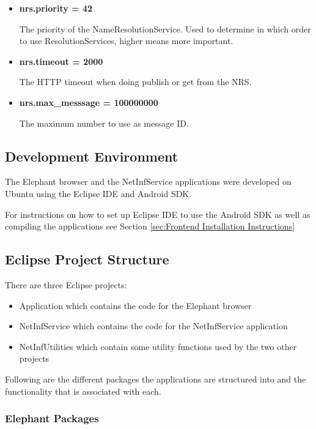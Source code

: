 \begin{itemize}
	\item{\bf nrs.priority = 42}	
	
	The priority of the NameResolutionService. Used to determine in which order to use ResolutionServices, higher means more important.	
	
	\item{\bf nrs.timeout = 2000}
	
	The HTTP timeout when doing publish or get from the NRS.
	
	\item{\bf nrs.max\_messsage = 100000000}
	
	The maximum number to use as message ID.
	
\end{itemize}

\subsection{Development Environment}

The Elephant browser and the NetInfService applications were developed on Ubuntu using the Eclipse IDE and Android SDK.

For instructions on how to set up Eclipse IDE to use the Android SDK as well as compiling the applications see Section \ref{sec:Frontend Installation Instructions}

\subsection{Eclipse Project Structure}

There are three Eclipse projects:

\begin{itemize} 
 \item Application which contains the code for the Elephant browser
 \item NetInfService which contains the code for the NetInfService application
 \item NetInfUtilities which contain some utility functions used by the two other projects
\end{itemize}
Following are the different packages the applications are structured into and the functionality that is associated with each.

\subsubsection{Elephant Packages}

